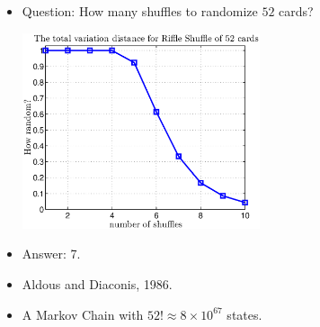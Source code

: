 \documentclass[12pt,t]{beamer}
\begin{document}
\begin{frame}
  \begin{itemize}
  \item Question: How many shuffles to randomize $52$ cards?
    \begin{center}
      \includegraphics[width=0.55\textwidth,trim=1cm 1cm 0cm 0cm]{riffleshuffle}
    \end{center}
  \item Answer: 7.
  \item Aldous and Diaconis, 1986.
  \item A Markov Chain with $52! \approx 8 \times 10^{67}$ states.
  \end{itemize}
\end{frame}
\end{document}
